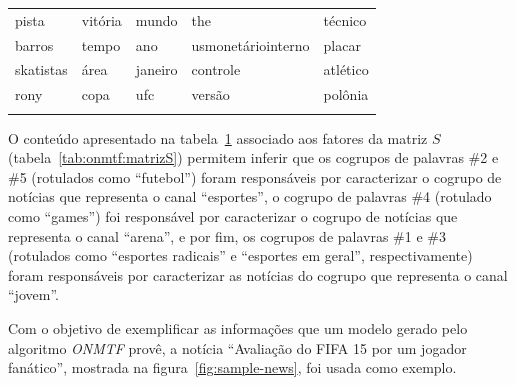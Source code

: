 \documentclass[
    12pt,                %
    oneside,            %
    a4paper,            %
    english,            %
    brazil                %
    ]{abntex2ppgsi}
\begin{document}
\begin{table}[H]
{\begin{tabular}{lllll}
            pista      & vitória    & mundo      & the                & técnico \\
            barros     & tempo      & ano        & usmonetáriointerno & placar \\
            skatistas  & área       & janeiro    & controle           & atlético \\
            rony       & copa       & ufc        & versão             & polônia \\
            \hline \\
        \end{tabular}
    }
    \label{tab:experiments-quali-words:onmtf}
\end{table}

O conteúdo apresentado na tabela~\ref{tab:experiments-quali-words:onmtf} associado aos fatores da matriz $S$ (tabela~\ref{tab:onmtf:matrizS}) permitem inferir que os cogrupos de palavras \#2 e \#5 (rotulados como ``futebol'') foram responsáveis por caracterizar o cogrupo de notícias que representa o canal ``esportes'', o cogrupo de palavras \#4 (rotulado como ``games'') foi responsável por caracterizar o cogrupo de notícias que representa o canal ``arena'', e por fim, os cogrupos de palavras \#1 e \#3 (rotulados como ``esportes radicais'' e ``esportes em geral'', respectivamente) foram responsáveis por caracterizar as notícias do cogrupo que representa o canal ``jovem''.


Com o objetivo de exemplificar as informações que um modelo gerado pelo algoritmo \textit{ONMTF} provê, a notícia ``Avaliação do FIFA 15 por um jogador fanático'', mostrada na figura~\ref{fig:sample-news}, foi usada como exemplo.
\end{document}
